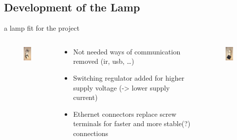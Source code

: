 \documentclass{beamer}
\begin{document}
 \subsection{Development of the Lamp}
  \begin{frame}{a lamp fit for the project}
    \begin{columns}
      \begin{column}{3.5cm}
        \begin{figure}
          \begin{center}
          \includegraphics[width=3cm]{bilder/lampe1.JPG}
          \end{center}
        \end{figure}
      \end{column}
      \begin{column}{5cm}
        \begin{itemize}
        \item Not needed ways of communication removed (ir, usb, \ldots)
        \item Switching regulator added for higher supply voltage (-> lower supply current)
        \item Ethernet connectors replace screw terminals for faster and more stable(?) connections
        \end{itemize}
      \end{column}
      \begin{column}{3.5cm}
         \begin{figure}
          \begin{center}
          \includegraphics[width=3cm]{bilder/lampe2.JPG}
          \end{center}
        \end{figure}
     \end{column}
    \end{columns}
  \end{frame}
\end{document}
